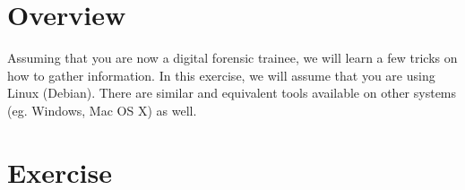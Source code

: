 \documentclass[a4paper, 10pt]{article}
\begin{document}
\subject
{}

\section{Overview}

Assuming that you are now a digital forensic trainee, we will learn a few tricks on how to gather information.
In this exercise, we will assume that you are using Linux (Debian).
There are similar and equivalent tools available on other systems (eg. Windows, Mac OS X) as well.

\section{Exercise}
\end{document}
